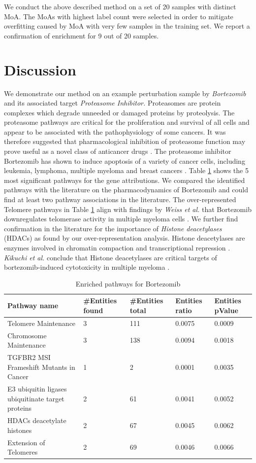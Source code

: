 \documentclass[bsc,frontabs,twoside,singlespacing,parskip,deptreport]{infthesis}     %
\let\Oldsection\section
\renewcommand{\section}{\FloatBarrier\Oldsection}
\begin{document}
We conduct the above described method on a set of 20 samples with distinct MoA. The MoAs with highest label count were selected in order to mitigate overfitting caused by MoA with very few samples in the training set. We report a confirmation of enrichment for 9 out of 20 samples. 

\section{Discussion}
We demonstrate our method on an example perturbation sample by \textit{Bortezomib} and its associated target \textit{Proteasome Inhibitor.} Proteasomes are protein complexes which degrade unneeded or damaged proteins by proteolysis. The proteasome pathways are critical for the proliferation and survival of all cells and appear to be associated with the pathophysiology of some cancers. It was therefore suggested that pharmacological inhibition of proteasome function may prove useful as a novel class of anticancer drugs \cite{chen_bortezomib_2011}. The proteasome inhibitor Bortezomib has shown to induce apoptosis of a variety of cancer cells, including leukemia, lymphoma, multiple myeloma and breast cancers \cite{cao_ubiquitin-proteasomal_2011}.
Table \ref{bortezomib} shows the 5 most significant pathways for the gene attributions. We compared the identified pathways with the literature on the pharmacodynamics of Bortezomib and could find at least two pathway associations in the literature. 
The over-represented Telomere pathways in Table \ref{bortezomib} align with findings by \textit{Weiss et al.} that Bortezomib downregulates telomerase activity in multiple myeloma cells \cite{weiss_differential_2012}.
We further find confirmation in the literature for the importance of \textit{Histone deacetylases} (HDACs) as found by our over-representation analysis. Histone deacetylases are enzymes involved in chromatin compaction and transcriptional repression \cite{yang_rpd3hda1_2008}. \textit{Kikuchi et al.} conclude that Histone deacetylases are critical targets of bortezomib-induced cytotoxicity in multiple myeloma \cite{kikuchi_histone_2010}.\\
\begin{table}[h!]
\centering
\begin{tabular}{p{8cm}p{1.5cm}p{1.5cm}p{1.5cm}p{1.5cm}}
\toprule
Pathway name &	\#Entities found &	\#Entities total &	Entities ratio &	Entities pValue\\
\midrule
Telomere Maintenance&	3&	111&	0.0075	&0.0009 \\
Chromosome Maintenance&	3&	138 &	0.0094&	0.0018 \\
TGFBR2 MSI Frameshift Mutants in Cancer &	1 &	2&	0.0001&	0.0035 \\
E3 ubiquitin ligases ubiquitinate target proteins&	2&	61&	0.0041&	0.0052\\
HDACs deacetylate histones&	2&	67&	0.0045&	0.0062\\
Extension of Telomeres&	2&	69&	0.0046&	0.0066 \\
\bottomrule
\end{tabular}
\caption{Enriched pathways for Bortezomib}\label{bortezomib}
\end{table}
\end{document}
